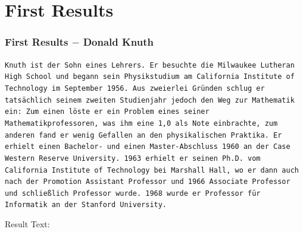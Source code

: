 \documentclass{beamer}
\begin{document}
\section{First Results}

\begin{frame}
\frametitle{First Results $-$ Donald Knuth}
\texttt{\tiny Knuth ist der Sohn eines Lehrers. Er besuchte die Milwaukee Lutheran \\
High School und begann sein Physikstudium am California Institute of \\
Technology im September 1956. Aus zweierlei Gründen schlug er \\
tatsächlich seinem zweiten Studienjahr jedoch den Weg zur Mathematik \\
ein: Zum einen löste er ein Problem eines seiner \\
Mathematikprofessoren, was ihm eine 1,0 als Note einbrachte, zum \\
anderen fand er wenig Gefallen an den physikalischen Praktika. Er \\
erhielt einen Bachelor- und einen Master-Abschluss 1960 an der Case \\
Western Reserve University. 1963 erhielt er seinen Ph.D. vom \\
California Institute of Technology bei Marshall Hall, wo er dann auch \\
nach der Promotion Assistant Professor und 1966 Associate Professor \\
und schließlich Professor wurde. 1968 wurde er Professor für \\
Informatik an der Stanford University.\\}

Result Text: \\


\end{frame}
\end{document}
